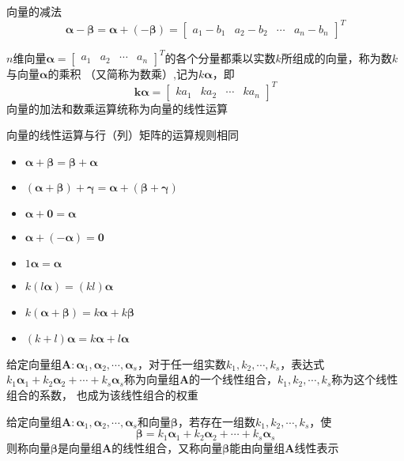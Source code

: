 \documentclass[UTF8]{ctexart}
\newcommand{\ve}[1]{{\bm{#1}}}
\newcommand{\mat}[1]{\ve{#1}}
\newcommand{\emplin}{\vspace{1em}}
\begin{document}
向量的减法
\[\mat{\alpha}-\mat{\beta}=\mat{\alpha}+(-\mat{\beta})=\begin{bmatrix}a_1-b_1&a_2-b_2&\cdots&a_n-b_n\end{bmatrix}^T\]

\emplin

$n$维向量$\mat{\alpha}=\begin{bmatrix}a_1&a_2&\cdots&a_n\end{bmatrix}^T$的各个分量都乘以实数$k$所组成的向量，称为数$k$与向量$\mat{\alpha}$的乘积
（又简称为数乘）,记为$k\mat{\alpha}$，即\[\mat{k\alpha}=\begin{bmatrix}ka_1&ka_2&\cdots&ka_n\end{bmatrix}^T\]
向量的加法和数乘运算统称为向量的线性运算

\emplin

向量的线性运算与行（列）矩阵的运算规则相同
\begin{itemize}
  \item $\mat{\alpha}+\mat{\beta}=\mat{\beta}+\mat{\alpha}$
  \item $(\mat{\alpha}+\mat{\beta})+\mat{\gamma}=\mat{\alpha}+(\mat{\beta}+\mat{\gamma})$
  \item $\mat{\alpha}+\mat{0}=\mat{\alpha}$
  \item $\mat{\alpha}+(-\mat{\alpha})=\mat{0}$
  \item $1\mat{\alpha}=\mat{\alpha}$
  \item $k(l\mat{\alpha})=(kl)\mat{\alpha}$
  \item $k(\mat{\alpha}+\mat{\beta})=k\mat{\alpha}+k\mat{\beta}$
  \item $(k+l)\mat{\alpha}=k\mat{\alpha}+l\mat{\alpha}$
\end{itemize}

\emplin

给定向量组$\mat{A}:\mat{\alpha}_1,\mat{\alpha}_2,\cdots,\mat{\alpha}_s$，对于任一组实数$k_1,k_2,\cdots,k_s$，表达式
$k_1\mat{\alpha}_1+k_2\mat{\alpha}_2+\cdots+k_s\mat{\alpha}_s$称为向量组$\mat{A}$的一个线性组合，$k_1,k_2,\cdots,k_s$称为这个线性组合的系数，
也成为该线性组合的权重

\emplin

给定向量组$\mat{A}:\mat{\alpha}_1,\mat{\alpha}_2,\cdots,\mat{\alpha}_s$和向量$\mat{\beta}$，若存在一组数$k_1,k_2,\cdots,k_s$，使
\[\mat{\beta}=k_1\mat{\alpha}_1+k_2\mat{\alpha}_2+\cdots+k_s\mat{\alpha}_s\]
则称向量$\mat{\beta}$是向量组$\mat{A}$的线性组合，又称向量$\mat{\beta}$能由向量组$\mat{A}$线性表示

\emplin
\end{document}
